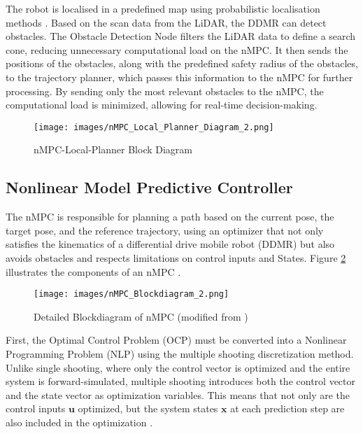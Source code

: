 \documentclass[conference]{IEEEtran}
\begin{document}
The robot is localised in a predefined map using probabilistic localisation methods \cite{thrun2005probabilistic}. Based on the scan data from the LiDAR, the DDMR can detect obstacles. The Obstacle Detection Node filters the LiDAR data to define a search cone, reducing unnecessary computational load on the nMPC. It then sends the positions of the obstacles, along with the predefined safety radius of the obstacles, to the trajectory planner, which passes this information to the nMPC for further processing. By sending only the most relevant obstacles to the nMPC, the computational load is minimized, allowing for real-time decision-making.

\begin{figure}[!h]
    \centering
    \texttt{[image: images/nMPC\_Local\_Planner\_Diagram\_2.png]}
    \caption{nMPC-Local-Planner Block Diagram }
    \label{fig:nMPC_Local_Planner_Diagram_2}
\end{figure}


\subsection{Nonlinear Model Predictive Controller}

The nMPC is responsible for planning a path based on the current pose, the target pose, and the reference trajectory, using an optimizer that not only satisfies the kinematics of a differential drive mobile robot (DDMR) but also avoids obstacles and respects limitations on control inputs and States. Figure \ref{fig:nMPC_Blockdiagram_2} illustrates the components of an nMPC \cite{falcone2007predictive}.

\begin{figure}[!h]
    \centering
    \texttt{[image: images/nMPC\_Blockdiagram\_2.png]}
    \caption{Detailed Blockdiagram of nMPC (modified from \cite{Effects_of_roll_dynamics_for_car_stability_control_by_laguerre_functions})}
    \label{fig:nMPC_Blockdiagram_2}
\end{figure}

First, the Optimal Control Problem (OCP) must be converted into a Nonlinear Programming Problem (NLP) using the multiple shooting discretization method. Unlike single shooting, where only the control vector is optimized and the entire system is forward-simulated, multiple shooting introduces both the control vector and the state vector as optimization variables. This means that not only are the control inputs \( \mathbf{u} \) optimized, but the system states \( \mathbf{x} \) at each prediction step are also included in the optimization \cite{BOCK19841603}. 
\end{document}
